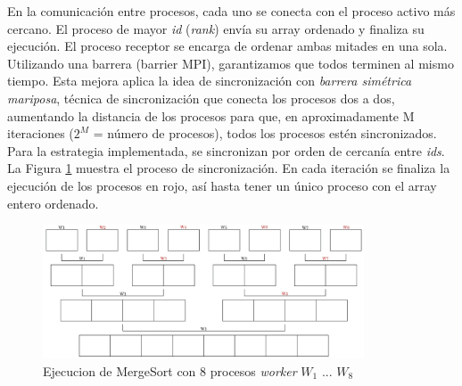 	En la comunicación entre procesos, cada uno se conecta con el proceso activo más cercano. El proceso de mayor \textit{id} (\textit{rank}) envía su array ordenado y finaliza su ejecución. El proceso receptor se encarga de ordenar ambas mitades en una sola. Utilizando una barrera (barrier MPI), garantizamos que todos terminen al mismo tiempo. Esta mejora aplica la idea de sincronización con \textit{barrera simétrica mariposa}, técnica de sincronización que conecta los procesos dos a dos, aumentando la distancia de los procesos para que, en aproximadamente M iteraciones (\(2^{M}\) = número de procesos), todos los procesos estén sincronizados. Para la estrategia implementada, se sincronizan por orden de cercanía entre \textit{ids}. La Figura \ref{fig:mergesortmpi} muestra el proceso de sincronización. En cada iteración se finaliza la ejecución de los procesos en rojo, así hasta tener un único proceso con el array entero ordenado.  
	
	\vspace{0.2cm}
	
	\begin{figure}[!h]
		\centering
		\includegraphics[width=0.85\textwidth]{images/chapter_3/mergesort_mpi}
		\caption{Ejecucion de MergeSort con 8 procesos \textit{worker} \(W_{1}\) ... \(W_{8}\)}
		\label{fig:mergesortmpi}
	\end{figure}

